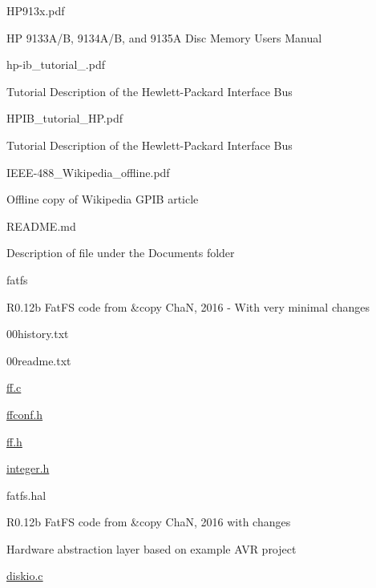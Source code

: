 \begin{DoxyItemize}
\begin{DoxyItemize}
\item H\+P913x.\+pdf
\begin{DoxyItemize}
\item HP 9133\+A/B, 9134\+A/B, and 9135A Disc Memory Users Manual
\end{DoxyItemize}
\item hp-\/ib\+\_\+tutorial\+\_.\+pdf
\begin{DoxyItemize}
\item Tutorial Description of the Hewlett-\/\+Packard Interface Bus
\end{DoxyItemize}
\item H\+P\+I\+B\+\_\+tutorial\+\_\+\+H\+P.\+pdf
\begin{DoxyItemize}
\item Tutorial Description of the Hewlett-\/\+Packard Interface Bus
\end{DoxyItemize}
\item I\+E\+E\+E-\/488\+\_\+\+Wikipedia\+\_\+offline.\+pdf
\begin{DoxyItemize}
\item Offline copy of Wikipedia G\+P\+IB article
\end{DoxyItemize}
\item R\+E\+A\+D\+M\+E.\+md
\begin{DoxyItemize}
\item Description of file under the Documents folder
\end{DoxyItemize}
\end{DoxyItemize}
\item fatfs
\begin{DoxyItemize}
\item R0.\+12b Fat\+FS code from \&copy ChaN, 2016 -\/ With very minimal changes
\item 00history.\+txt
\item 00readme.\+txt
\item \hyperlink{ff_8c}{ff.\+c}
\item \hyperlink{ffconf_8h}{ffconf.\+h}
\item \hyperlink{ff_8h}{ff.\+h}
\item \hyperlink{integer_8h}{integer.\+h}
\end{DoxyItemize}
\item fatfs.\+hal
\begin{DoxyItemize}
\item R0.\+12b Fat\+FS code from \&copy ChaN, 2016 with changes
\item Hardware abstraction layer based on example A\+VR project
\item \hyperlink{diskio_8c}{diskio.\+c}

\end{DoxyItemize}
\end{DoxyItemize}
